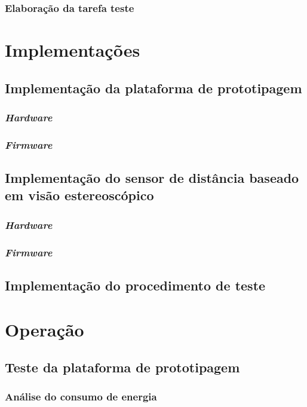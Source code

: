     \subsection{Elaboração da tarefa teste}
    \pagebreak
    
\chapter{Implementações}

\section{Implementação da plataforma de prototipagem}
    \subsection{\textit{Hardware}}
    \pagebreak
    \subsection{\textit{Firmware}}
    \pagebreak
    
\section{Implementação do sensor de distância baseado em visão estereoscópico}
    \subsection{\textit{Hardware}}
    \pagebreak
    \subsection{\textit{Firmware}}
    \pagebreak
    
\section{Implementação do procedimento de teste}

\chapter{Operação}

\section{Teste da plataforma de prototipagem}
    \subsection{Análise do consumo de energia}
    \pagebreak
    
